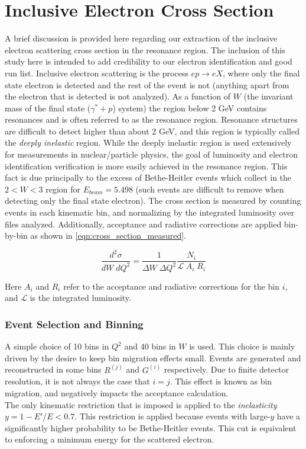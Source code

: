 \section{Inclusive Electron Cross Section}
A brief discussion is provided here regarding our extraction of the inclusive electron scattering cross section in the resonance region.  The inclusion of this study here is intended to add credibility to our electron identification and good run list.  Inclusive electron scattering is the process $e p \rightarrow e X$, where only the final state electron is detected and the rest of the event is not (anything apart from the electron that is detected is not analyzed).  As a function of $W$ (the invariant mass of the final state ($\gamma^* + p$) system) the region below 2 GeV contains resonances and is often referred to as the resonance region.  Resonance structures are difficult to detect higher than about 2 GeV, and this region is typically called the \textit{deeply inelastic} region.  While the deeply inelastic region is used extensively for measurements in nuclear/particle physics, the goal of luminosity and electron identification verification is more easily achieved in the resonance region.  This fact is due principally to the excess of Bethe-Heitler events which collect in the $2 < W < 3$ region for $E_{beam} = 5.498$ (such events are difficult to remove when detecting only the final state electron).  The cross section is measured by counting events in each kinematic bin, and normalizing by the integrated luminosity over files analyzed.  Additionally, acceptance and radiative corrections are applied bin-by-bin as shown in \ref{eqn:cross_section_measured}.

\begin{equation}
	\label{eqn:cross_section_measured}
	\frac{d^2 \sigma}{dW \; dQ^2} = \frac{1}{\Delta W \; \Delta Q^2} \frac{N_{i}}{\mathcal{L} \; A_i \; R_i}
\end{equation}

Here $A_i$ and $R_i$ refer to the acceptance and radiative corrections for the bin $i$, and $\mathcal{L}$ is the integrated luminosity.  

\subsubsection*{Event Selection and Binning}
A simple choice of 10 bins in $Q^2$ and 40 bins in $W$ is used.  This choice is mainly driven by the desire to keep bin migration effects small.  Events are generated and reconstructed in some bins $R^{(j)}$ and $G^{(i)}$ respectively.  Due to finite detector resolution, it is not always the case that $i = j$.  This effect is known as bin migration, and negatively impacts the acceptance calculation.\\
The only kinematic restriction that is imposed is applied to the \textit{inelasticity} $y = 1-E'/E < 0.7$.  This restriction is applied because events with large-$y$ have a significantly higher probability to be Bethe-Heitler events.  This cut is equivalent to enforcing a minimum energy for the scattered electron.

